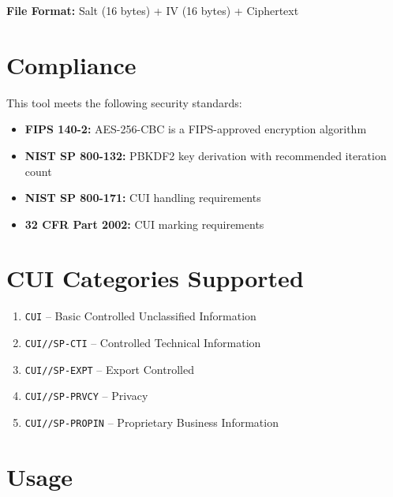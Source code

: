 \documentclass[11pt,letterpaper]{article}
\begin{document}
\vspace{12pt}

\textbf{File Format:} Salt (16 bytes) + IV (16 bytes) + Ciphertext

\section*{Compliance}

This tool meets the following security standards:

\begin{itemize}
    \item \textbf{FIPS 140-2:} AES-256-CBC is a FIPS-approved encryption algorithm
    \item \textbf{NIST SP 800-132:} PBKDF2 key derivation with recommended iteration count
    \item \textbf{NIST SP 800-171:} CUI handling requirements
    \item \textbf{32 CFR Part 2002:} CUI marking requirements
\end{itemize}

\section*{CUI Categories Supported}

\begin{enumerate}
    \item \texttt{CUI} -- Basic Controlled Unclassified Information
    \item \texttt{CUI//SP-CTI} -- Controlled Technical Information
    \item \texttt{CUI//SP-EXPT} -- Export Controlled
    \item \texttt{CUI//SP-PRVCY} -- Privacy
    \item \texttt{CUI//SP-PROPIN} -- Proprietary Business Information
\end{enumerate}

\section*{Usage}
\end{document}
